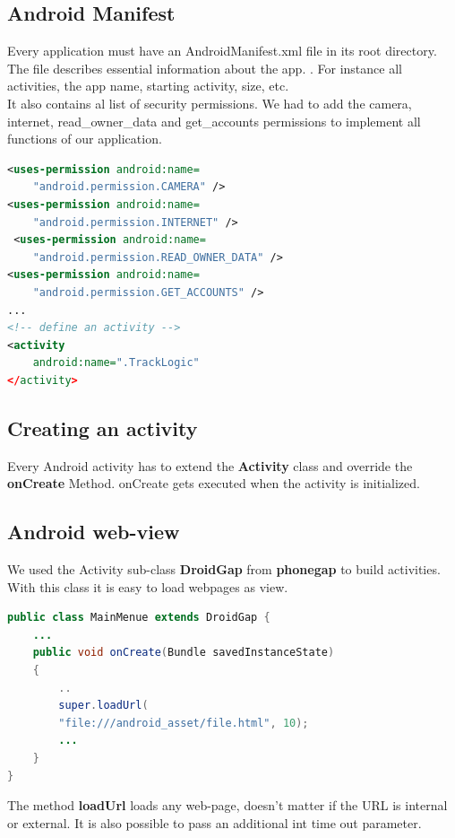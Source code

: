 \subsection{Android Manifest}
Every application must have an AndroidManifest.xml file in its root directory. The file describes essential information about the app. \cite{androidManifest}. For instance all activities, the app name, starting activity, size, etc. 
\\

It also contains al list of security permissions. We had to add the camera, internet, read\_owner\_data and get\_accounts permissions to implement all functions of our application. 

\newpage
\begin{lstlisting}[language=xml, caption= 
extracts from our AndroidManifest,captionpos=b]
<uses-permission android:name=
	"android.permission.CAMERA" />
<uses-permission android:name=
	"android.permission.INTERNET" />
 <uses-permission android:name=
 	"android.permission.READ_OWNER_DATA" />
<uses-permission android:name=
	"android.permission.GET_ACCOUNTS" /> 
...
<!-- define an activity -->
<activity
	android:name=".TrackLogic"          
</activity>
\end{lstlisting}

\subsection{Creating an activity}
Every Android activity has to extend the \textbf{Activity} class and override the \textbf{onCreate} Method. onCreate gets executed when the activity is initialized.

\subsection{Android web-view}
We used the Activity sub-class \textbf{DroidGap} from \textbf{phonegap} to build activities. With this class it is easy to load webpages as view. 
\\



\begin{lstlisting}[language=java, caption= 
extracts from our source code,captionpos=b]
public class MainMenue extends DroidGap {
	...
	public void onCreate(Bundle savedInstanceState)
	{
		..
		super.loadUrl(
		"file:///android_asset/file.html", 10);
		...
	}
}
\end{lstlisting}

The method \textbf{loadUrl} loads any web-page, doesn't matter if the URL is internal or external. It is also possible to pass an additional int time out parameter.   



